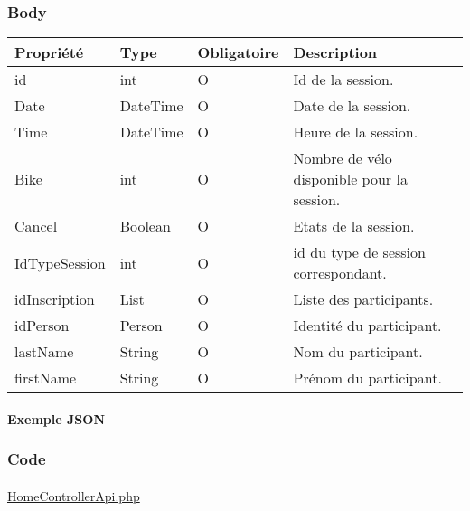 	\subsubsection{Body}
		\begin{center}
			\begin{tabularx}{\textwidth}{| T{0.2122\textwidth} | S{0.22\textwidth} | S{0.15\textwidth} | S{0.3\textwidth} |}
				\hline
				Propriété & Type & Obligatoire & Description \\
				\hline
				id & int & O & Id de la session. \\
				\hline
				Date & DateTime & O & Date de la session. \\
				\hline
				Time & DateTime & O & Heure de la session. \\
				\hline
				Bike & int & O & Nombre de vélo disponible pour la session. \\
				\hline
				Cancel & Boolean & O & Etats de la session. \\
				\hline
				IdTypeSession & int & O & id du type de session correspondant. \\
				\hline
				idInscription & List & O & Liste des participants. \\
				\hline
				idPerson & Person & O & Identité du participant. \\
				\hline
				lastName & String & O & Nom du participant. \\
				\hline
				firstName & String & O & Prénom du participant. \\
				\hline
			\end{tabularx}
		\end{center}
		
		\newpage
		\paragraph{Exemple JSON}
			\paragraph{}
			
			
			
	\subsubsection{Code}
		\paragraph{}
			\href{https://github.com/victorsmits/Aquabike/blob/master/backend/src/Controller/API/HomeControllerApi.php}{HomeControllerApi.php}
